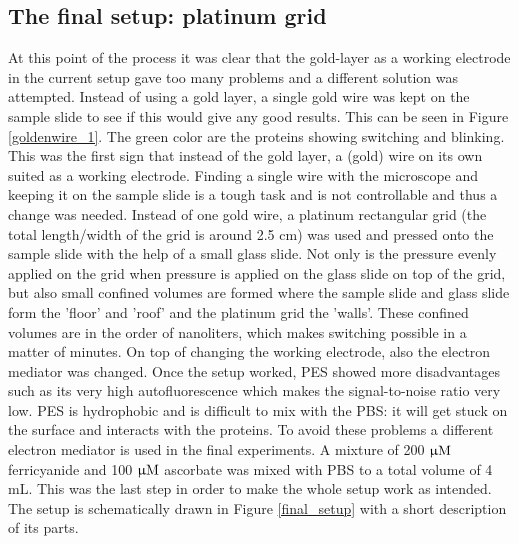\documentclass[twoside,single]{lion-msc}
\begin{document}
\subsection*{The final setup: platinum grid} \label{grid_1}
At this point of the process it was clear that the gold-layer as a working electrode in the current setup gave too many problems and a different solution was attempted. Instead of using a gold layer, a single gold wire was kept on the sample slide to see if this would give any good results. This can be seen in Figure \ref{goldenwire_1}. The green color are the proteins showing switching and blinking. This was the first sign that instead of the gold layer, a (gold) wire on its own suited as a working electrode. Finding a single wire with the microscope and keeping it on the sample slide is a tough task and is not controllable and thus a change was needed. Instead of one gold wire, a platinum rectangular grid (the total length/width of the grid is around 2.5 cm) was used and pressed onto the sample slide with the help of a small glass slide. Not only is the pressure evenly applied on the grid when pressure is applied on the glass slide on top of the grid, but also small confined volumes are formed where the sample slide and glass slide form the 'floor' and 'roof' and the platinum grid the 'walls'. These confined volumes are in the order of nanoliters, which makes switching possible in a matter of minutes. On top of changing the working electrode, also the electron mediator was changed. Once the setup worked, PES showed more disadvantages such as its very high autofluorescence which makes the signal-to-noise ratio very low. PES is hydrophobic and is difficult to mix with the PBS: it will get stuck on the surface and interacts with the proteins. To avoid these problems a different electron mediator is used in the final experiments. A mixture of 200 $\upmu \textup{M}$ ferricyanide and 100 $\upmu \textup{M}$ ascorbate was mixed with PBS to a total volume of 4 mL. This was the last step in order to make the whole setup work as intended. The setup is schematically drawn in Figure \ref{final_setup} with a short description of its parts.
\end{document}
